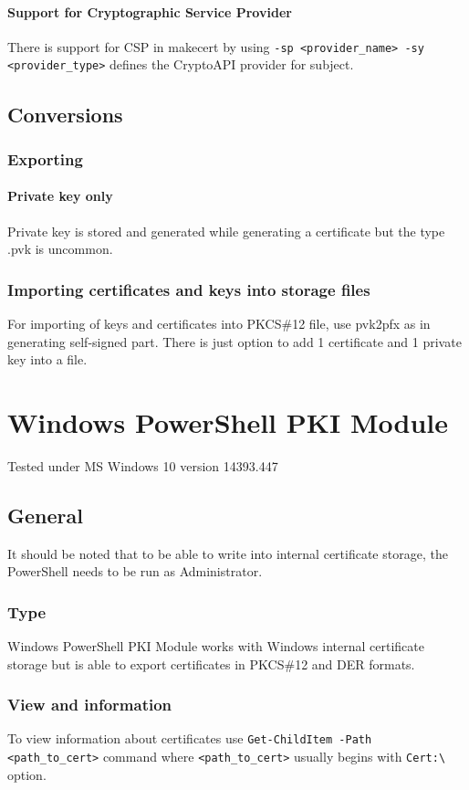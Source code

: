 \documentclass[10pt, a4paper]{report}
\begin{document}
{    \subsubsection{Support for Cryptographic Service Provider}
There is support for CSP in makecert by using \verb+-sp <provider_name> -sy <provider_type>+ defines the CryptoAPI provider for subject.
\section{Conversions}

  \subsection{Exporting}
  
    \subsubsection{Private key only}
Private key is stored and generated while generating a certificate but the type .pvk is uncommon.

  \subsection{Importing certificates and keys into storage files}
For importing of keys and certificates into PKCS\#12 file, use pvk2pfx as in generating self-signed part. There is just option to add 1 certificate and 1 private key into a file.


\chapter{Windows PowerShell PKI Module}

Tested under MS Windows 10 version 14393.447

\section{General}

It should be noted that to be able to write into internal certificate storage, the PowerShell needs to be run as Administrator.
  \subsection{Type}
Windows PowerShell PKI Module works with Windows internal certificate storage but is able to export certificates in PKCS\#12 and DER formats. 
  \subsection{View and information}
To view information about certificates use \verb+Get-ChildItem -Path <path_to_cert>+ command where \verb+<path_to_cert>+ usually begins with \verb+Cert:\+ option.

}
\end{document}
